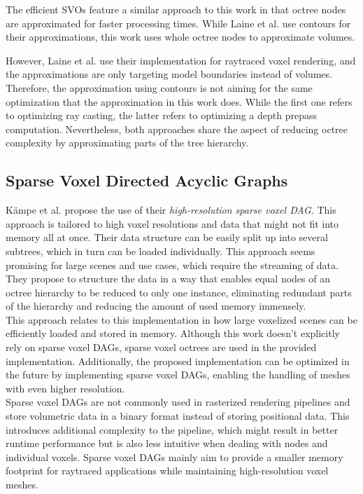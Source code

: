 \noindent
The efficient \ac{SVO}s feature a similar approach to this work in that octree nodes are approximated for faster 
processing times. While Laine et al. use contours for their approximations, this work uses whole octree nodes 
to approximate volumes. \\

\clearpage

\noindent
However, Laine et al. use their implementation for raytraced voxel rendering, and the 
approximations are only targeting model boundaries instead of volumes. Therefore, the approximation using contours 
is not aiming for the same optimization that the approximation in this work does. While the first one refers 
to optimizing ray casting, the latter refers to optimizing a depth prepass computation. Nevertheless, both 
approaches share the aspect of reducing octree complexity by approximating parts of the tree hierarchy.


\subsection*{Sparse Voxel Directed Acyclic Graphs}

Kämpe et al. \cite{Kampe2013} propose the use of their \emph{high-resolution sparse voxel \ac{DAG}}. This approach 
is tailored to high voxel resolutions and data that might not fit into memory all at once. Their data structure can 
be easily split up into several subtrees, which in turn can be loaded individually. This approach seems promising 
for large scenes and use cases, which require the streaming of data. They propose to structure the data in a way that 
enables equal nodes of an octree hierarchy to be reduced to only one instance, eliminating redundant parts of the 
hierarchy and reducing the amount of used memory immensely. \\

\noindent
This approach relates to this implementation in how large voxelized scenes can be efficiently loaded and stored in 
memory. Although this work doesn't explicitly rely on sparse voxel \ac{DAG}s, sparse voxel octrees are used in the 
provided implementation. Additionally, the proposed implementation can be optimized in the future by implementing 
sparse voxel \ac{DAG}s, enabling the handling of meshes with even higher resolution. \\

\noindent
Sparse voxel \ac{DAG}s are not commonly used in rasterized rendering pipelines and store volumetric data in a binary 
format instead of storing positional data. This introduces additional complexity to the pipeline, which might result in 
better runtime performance but is also less intuitive when dealing with nodes and individual voxels. Sparse voxel 
\ac{DAG}s mainly aim to provide a smaller memory footprint for raytraced applications while maintaining high-resolution 
voxel meshes. \\

